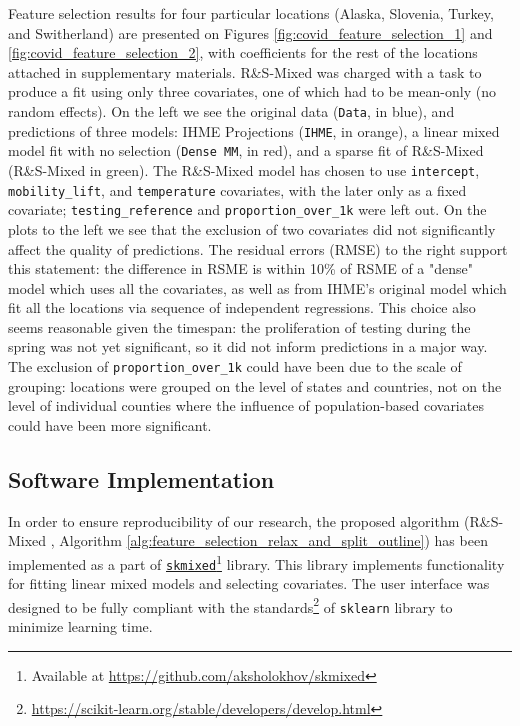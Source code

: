 \documentclass[11pt,letterpaper]{article}
\newcommand{\ouralgo}{R\&S-Mixed }
\numberwithin{equation}{section} %
\numberwithin{figure}{section} %
\numberwithin{table}{section} %
\begin{document}
Feature selection results for four particular locations (Alaska, Slovenia, Turkey, and Switherland) are presented on Figures \ref{fig:covid_feature_selection_1} and \ref{fig:covid_feature_selection_2}, with coefficients for the rest of the locations attached in supplementary materials. \ouralgo was charged with a task to produce a fit using only three covariates, one of which had to be mean-only (no random effects). On the left we see the original data (\texttt{Data}, in {\color{blue} blue}), and predictions of three models: IHME Projections (\texttt{IHME}, in {\color{orange} orange}), a linear mixed model fit with no selection (\texttt{Dense MM}, in {\color{red} red}), and a sparse fit of \ouralgo (\ouralgo in {\color{green} green}). The \ouralgo model has chosen to use \texttt{intercept}, \texttt{mobility\_lift}, and \texttt{temperature} covariates, with the later only as a fixed covariate; \texttt{testing\_reference} and \texttt{proportion\_over\_1k} were left out. On the plots to the left we see that the exclusion of two covariates did not significantly affect the quality of predictions. The residual errors (RMSE) to the right support this statement: the difference in RSME is within 10\% of RSME of a "dense" model which uses all the covariates, as well as from IHME's original model which fit all the locations via sequence of independent regressions. This choice also seems reasonable given the timespan: the proliferation of testing during the spring was not yet significant, so it did not inform predictions in a major way. The exclusion of \texttt{proportion\_over\_1k} could have been due to the scale of grouping: locations were grouped on the level of states and countries, not on the level of individual counties where the influence of population-based covariates could have been more significant. 



\subsection{Software Implementation}
In order to ensure reproducibility of our research, the proposed algorithm (\ouralgo, Algorithm \ref{alg:feature_selection_relax_and_split_outline}) has been implemented as a part of \texttt{\href{https://github.com/aksholokhov/skmixed}{skmixed}}\footnote{Available at \href{https://github.com/aksholokhov/skmixed}{https://github.com/aksholokhov/skmixed}} library. This library implements functionality for fitting linear mixed models and selecting covariates. The user interface was designed to be fully compliant with the standards\footnote{\href{https://scikit-learn.org/stable/developers/develop.html}{https://scikit-learn.org/stable/developers/develop.html}} of \texttt{sklearn} library to minimize learning time. 
\end{document}

